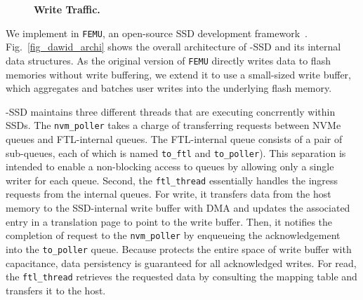 \begin{figure}[!t]
    \centering{}
    \caption{\textbf{Write Traffic.}}
    \label{fig_perf_wt}
\end{figure} 



We implement \ours{} in \texttt{FEMU}, an open-source SSD development
framework~\cite{li2018case}. Fig.~\ref{fig_dawid_archi} shows the overall
architecture of \ours{}-SSD and its internal data structures. As the original
version of \texttt{FEMU} directly writes data to flash memories without write
buffering, we extend it to use a small-sized write buffer, which aggregates and  
batches user writes into the underlying flash memory.  

\ours{}-SSD maintains three different threads that are executing concrrently
within SSDs.  The \texttt{nvm\_poller} takes a charge of transferring requests
between NVMe queues and FTL-internal queues. The FTL-internal queue consists of
a pair of sub-queues, each of which is named \texttt{to\_ftl} and
\texttt{to\_poller}). This separation is intended to enable a non-blocking
access to queues by allowing only a single writer for each queue.  Second, the
\texttt{ftl\_thread} essentially handles the ingress requests from the internal
queues. For write, it transfers data from the host memory to the SSD-internal
write buffer with DMA and updates the associated entry in a translation page to
point to the write buffer. Then, it notifies the completion of request to the
\texttt{nvm\_poller} by enqueueing the acknowledgement into the
\texttt{to\_poller} queue.  Because \ours{} protects the entire space of write
buffer with capacitance, data persistency is guaranteed for all acknowledged
writes.  For read, the \texttt{ftl\_thread} retrieves the requested data by
consulting the mapping table and transfers it to the host. 


